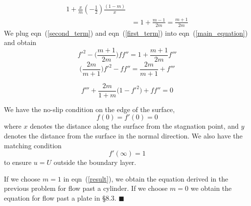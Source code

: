 \documentclass[11pt]{article}
\newcommand{\eqn}[2]{
  \begin{equation}
    \label{#1}
    #2
  \end{equation}
}
\newcommand{\eqr}[1]{eqn~(\ref{#1})}
\begin{document}
\begin{description}
\begin{align}
  1
  + \frac{x}{m}
  (-\frac{1}{2})
  \frac{(1-m)}{x}
  \\
%
%
  \label{first_term}
  &=
  1
  + \frac{m - 1}{2m}
  =
  \frac{m + 1}{2m}
\end{align}
We plug \eqr{second_term} and \eqr{first_term} into \eqr{main_equation} and
obtain
$$
  f'^2
  - \bigg(
  \frac{m + 1}{2m}
  \bigg) ff''
  =
  1
  + \frac{m + 1}{2m} f'''
$$
$$
  \bigg(\frac{2m}{m+1}\bigg) f'^2
  - ff''
  =
  \frac{2m}{m+1}
  + f'''
$$
\eqn{result}{
  f''' 
  + \frac{2m}{1 + m}
  \bigg(1 - f'^2 \bigg)
  + ff''
  =
  0
}
We have the no-slip condition on the edge of the surface,
$$
  f(0) = f'(0) = 0
$$
where $x$ denotes the distance along the surface from the stagnation point, and
$y$ denotes the distance from the surface in the normal direction. We
also have the matching condition
$$
  f'(\infty) = 1
$$
to ensure $u = U$ outside the boundary layer.

If we choose $m = 1$ in \eqr{result}, we obtain the equation derived in the
previous problem for flow past a cylinder. If we choose $m = 0$ we obtain the
equation for flow past a plate in \S 8.3.
\hfill $\blacksquare$
\end{description}
\end{document}
